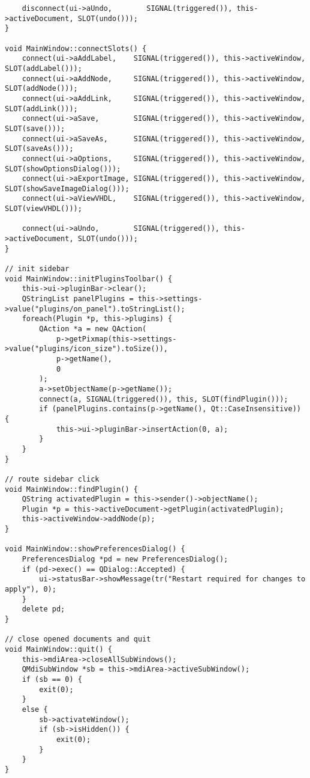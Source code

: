 \begin{lstlisting}
    disconnect(ui->aUndo,        SIGNAL(triggered()), this->activeDocument, SLOT(undo()));
}

void MainWindow::connectSlots() {
    connect(ui->aAddLabel,    SIGNAL(triggered()), this->activeWindow, SLOT(addLabel()));
    connect(ui->aAddNode,     SIGNAL(triggered()), this->activeWindow, SLOT(addNode()));
    connect(ui->aAddLink,     SIGNAL(triggered()), this->activeWindow, SLOT(addLink()));
    connect(ui->aSave,        SIGNAL(triggered()), this->activeWindow, SLOT(save()));
    connect(ui->aSaveAs,      SIGNAL(triggered()), this->activeWindow, SLOT(saveAs()));
    connect(ui->aOptions,     SIGNAL(triggered()), this->activeWindow, SLOT(showOptionsDialog()));
    connect(ui->aExportImage, SIGNAL(triggered()), this->activeWindow, SLOT(showSaveImageDialog()));
    connect(ui->aViewVHDL,    SIGNAL(triggered()), this->activeWindow, SLOT(viewVHDL()));

    connect(ui->aUndo,        SIGNAL(triggered()), this->activeDocument, SLOT(undo()));
}

// init sidebar
void MainWindow::initPluginsToolbar() {
    this->ui->pluginBar->clear();
    QStringList panelPlugins = this->settings->value("plugins/on_panel").toStringList();
    foreach(Plugin *p, this->plugins) {
        QAction *a = new QAction(
            p->getPixmap(this->settings->value("plugins/icon_size").toSize()),
            p->getName(),
            0
        );
        a->setObjectName(p->getName());
        connect(a, SIGNAL(triggered()), this, SLOT(findPlugin()));
        if (panelPlugins.contains(p->getName(), Qt::CaseInsensitive)) {
            this->ui->pluginBar->insertAction(0, a);
        }
    }
}

// route sidebar click
void MainWindow::findPlugin() {
    QString activatedPlugin = this->sender()->objectName();
    Plugin *p = this->activeDocument->getPlugin(activatedPlugin);
    this->activeWindow->addNode(p);
}

void MainWindow::showPreferencesDialog() {
    PreferencesDialog *pd = new PreferencesDialog();
    if (pd->exec() == QDialog::Accepted) {
        ui->statusBar->showMessage(tr("Restart required for changes to apply"), 0);
    }
    delete pd;
}

// close opened documents and quit
void MainWindow::quit() {
    this->mdiArea->closeAllSubWindows();
    QMdiSubWindow *sb = this->mdiArea->activeSubWindow();
    if (sb == 0) {
        exit(0);
    }
    else {
        sb->activateWindow();
        if (sb->isHidden()) {
            exit(0);
        }
    }
}


\end{lstlisting}
